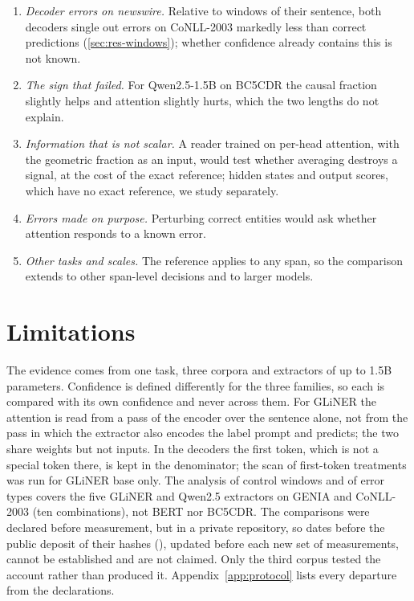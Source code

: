 \documentclass[11pt,a4paper]{article}
\newcommand{\gliner}{GLiNER}
\begin{document}
\begin{enumerate}
  \item \emph{Decoder errors on newswire.} Relative to windows of their sentence, both decoders single out errors on
  CoNLL-2003 markedly less than correct predictions (\cref{sec:res-windows}); whether confidence already contains this is
  not known.
  \item \emph{The sign that failed.} For Qwen2.5-1.5B on BC5CDR the causal fraction slightly helps and attention slightly
  hurts, which the two lengths do not explain.
  \item \emph{Information that is not scalar.} A reader trained on per-head attention, with the geometric fraction as an
  input, would test whether averaging destroys a signal, at the cost of the exact reference; hidden states and output scores,
  which have no exact reference, we study separately.
  \item \emph{Errors made on purpose.} Perturbing correct entities would ask whether attention responds to a known error.
  \item \emph{Other tasks and scales.} The reference applies to any span, so the comparison extends to other span-level
  decisions and to larger models.
\end{enumerate}

\section{Limitations}
\label{sec:limitations}

The evidence comes from one task, three corpora and extractors of up to 1.5B parameters. Confidence is defined differently
for the three families, so each is compared with its own confidence and never across them. For \gliner{} the attention is read from a pass of the encoder over the sentence alone, not from the pass in which the extractor also encodes the label prompt and predicts; the two share weights but not inputs. In the decoders the first token, which is not a special token there, is kept in the denominator; the scan of first-token treatments was run for \gliner{} base only. The analysis of control windows
and of error types covers the five \gliner{} and Qwen2.5 extractors on GENIA and CoNLL-2003 (ten combinations), not BERT
nor BC5CDR. The comparisons were declared before measurement, but in a private repository, so dates before the public deposit of
their hashes (\preregDOI), updated before each new set of measurements, cannot be established and are not claimed. Only the third corpus tested the account rather than produced it. Appendix~\ref{app:protocol} lists every
departure from the declarations.
\end{document}
